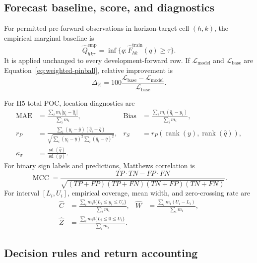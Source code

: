 \documentclass[10pt,letterpaper]{article}
\numberwithin{equation}{section}
\newcommand{\I}{\mathbb{I}}
\theoremstyle{definition}
\theoremstyle{remark}
\begin{document}
\subsection{Forecast baseline, score, and diagnostics}

For permitted pre-forward observations in horizon-target cell \((h,k)\), the
empirical marginal baseline is
\begin{equation}
\widehat Q^{\mathrm{emp}}_{hk\tau}
=\inf\{q:\widehat F^{\mathrm{train}}_{hk}(q)\geq\tau\}.
\label{eq:empirical-baseline}
\end{equation}
It is applied unchanged to every development-forward row. If
\(\mathcal{L}_{\mathrm{model}}\) and \(\mathcal{L}_{\mathrm{base}}\) are
Equation~\eqref{eq:weighted-pinball}, relative improvement is
\begin{equation}
\Delta_{\%}
=100\frac{\mathcal{L}_{\mathrm{base}}-\mathcal{L}_{\mathrm{model}}}
{\mathcal{L}_{\mathrm{base}}}.
\label{eq:relative-improvement}
\end{equation}

For H5 total POC, location diagnostics are
\begin{align}
\operatorname{MAE}
&=\frac{\sum_i m_i|y_i-\widehat q_i|}{\sum_i m_i},&
\operatorname{Bias}
&=\frac{\sum_i m_i(\widehat q_i-y_i)}{\sum_i m_i},\nonumber\\
r_P&=\frac{\sum_i(y_i-\bar y)(\widehat q_i-\bar q)}
{\sqrt{\sum_i(y_i-\bar y)^2\sum_i(\widehat q_i-\bar q)^2}},&
r_S&=r_P(\operatorname{rank}(y),\operatorname{rank}(\widehat q)),\nonumber\\
\kappa_\sigma&=\frac{\operatorname{sd}(\widehat q)}
{\operatorname{sd}(y)}.
\label{eq:signal-metrics}
\end{align}
For binary sign labels and predictions, Matthews correlation is
\begin{equation}
\operatorname{MCC}
=\frac{TP\cdot TN-FP\cdot FN}
{\sqrt{(TP+FP)(TP+FN)(TN+FP)(TN+FN)}}.
\label{eq:mcc}
\end{equation}
For interval \([L_i,U_i]\), empirical coverage, mean width, and zero-crossing
rate are
\begin{align}
\widehat C&=\frac{\sum_i m_i\I\{L_i\leq y_i\leq U_i\}}{\sum_i m_i},&
\widehat W&=\frac{\sum_i m_i(U_i-L_i)}{\sum_i m_i},\nonumber\\
\widehat Z&=\frac{\sum_i m_i\I\{L_i\leq0\leq U_i\}}{\sum_i m_i}.
\label{eq:interval-metrics}
\end{align}

\subsection{Decision rules and return accounting}
\end{document}
